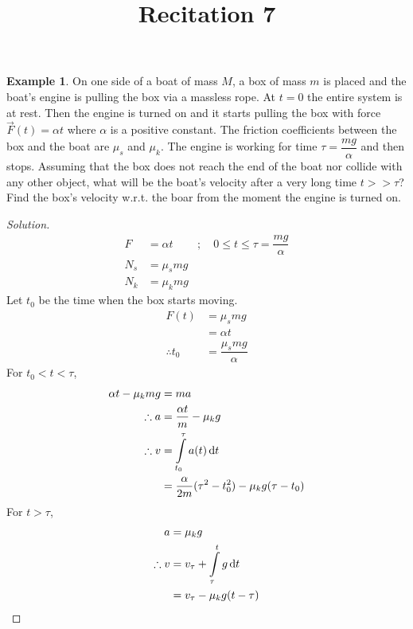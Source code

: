 \documentclass[fleqn, a4paper, 12pt]{article}
\title{Recitation 7}
\author{}
\date{\formatdate{10}{12}{2014}}
\theoremstyle{definition}
\newtheorem{example}{Example}
\theoremstyle{theorem}
\newenvironment{solution}
{\begin{proof}[Solution]\let\qed\relax}
	{\end{proof}}
\begin{document}
\maketitle

\tableofcontents

\newpage
\section{}

\begin{example}
	On one side of a boat of mass $M$, a box of mass $m$ is placed and the boat's engine is pulling the box via a massless rope. At $t = 0$ the entire system is at rest. Then the engine is turned on and it starts pulling the box with force $\overrightarrow{F}(t) = \alpha t$ where $\alpha$ is a positive constant. The friction coefficients between the box and the boat are $\mu_s$ and $\mu_k$. The engine is working for time $\tau = \dfrac{mg}{\alpha}$ and then stops. Assuming that the box does not reach the end of the boat nor collide with any other object, what will be the boat's velocity after a very long time $t >> \tau$? Find the box's velocity w.r.t. the boar from the moment the engine is turned on.
\end{example}

\begin{solution}
	\begin{align*}
		F &= \alpha t &;\quad 0 \leq t \leq \tau = \dfrac{mg}{\alpha}\\
		N_s &= \mu_s m g\\
		N_k &= \mu_k m g
	\end{align*}
	Let $t_0$ be the time when the box starts moving.
	\begin{align*}
		F(t) &= \mu_s m g\\
		&= \alpha t\\
		\therefore t_0 &= \dfrac{\mu_s m g}{\alpha}
	\end{align*}
	For $t_0 < t < \tau$,
	\begin{align*}
		\alpha t - \mu_k m g &= m a\\
		\therefore a &= \dfrac{\alpha t}{m} - \mu_k g\\
		\therefore v &= \int\limits_{t_0}^{\tau} a(t) \dif t\\
		&= \dfrac{\alpha}{2m} (\tau^2 - t_0^2) - \mu_k g (\tau - t_0)
	\end{align*}
	For $t > \tau$,
	\begin{align*}
		a &= \mu_k g\\
		\therefore v &= v_{\tau} + \int\limits_{\tau}^{t} g \dif t\\
		&= v_{\tau} - \mu_k g (t - \tau)
	\end{align*}
	
\end{solution}
\end{document}
